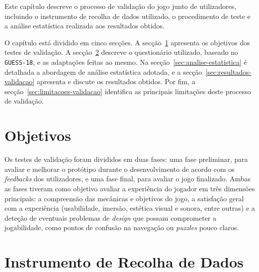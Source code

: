 \documentclass[a4paper, 12pt]{book}
\begin{document}
Este capítulo descreve o processo de validação do jogo junto de utilizadores,
incluindo o instrumento de recolha de dados utilizado, o procedimento de teste
e a análise estatística realizada aos resultados obtidos.

O capítulo está dividido em cinco secções. A secção~\ref{sec:objetivos-validacao}
apresenta os objetivos dos testes de validação. A secção~\ref{sec:instrumento}
descreve o questionário utilizado, baseado no \texttt{GUESS-18}, e as adaptações
feitas ao mesmo. Na secção~\ref{sec:analise-estatistica}
é detalhada a abordagem de análise estatística adotada, e a secção~\ref{sec:resultados-validacao}
apresenta e discute os resultados obtidos. Por fim, a secção~\ref{sec:limitacoes-validacao}
identifica as principais limitações deste processo de validação.

\section{Objetivos}
\label{sec:objetivos-validacao}

Os testes de validação foram divididos em duas fases: uma fase preliminar, para avaliar
e melhorar o protótipo durante o desenvolvimento de acordo com os \textit{feedbacks} dos 
utilizadores, e uma fase final, para avaliar o jogo
finalizado. Ambas as fases
tiveram como objetivo avaliar a experiência do jogador
em três dimensões principais: a compreensão das mecânicas e objetivos do jogo,
a satisfação geral com a experiência (usabilidade, imersão, estética visual e
sonora, entre outras) e a deteção de eventuais problemas de \textit{design} que
possam comprometer a jogabilidade, como pontos de confusão na navegação ou
\textit{puzzles} pouco claros.

\section{Instrumento de Recolha de Dados}
\label{sec:instrumento}
\end{document}
